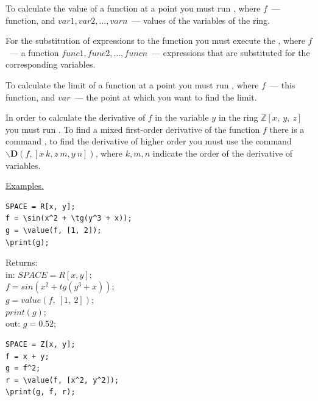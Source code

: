 To calculate the value of a function at a point you must run 
,
where $f$~---function, and 
$var1, var2, \ldots, varn $~--- values 
of the variables of the 
ring.

 For the substitution of expressions to the function you must execute the 
, where $ f $~--- a function
$ func1, func2, \ldots, funcn $~--- expressions that are substituted for the corresponding variables.

 To calculate the limit of a function at a point you must run 
,
where $ f $~--- this function, and $ var $~--- the point at which you want to find the limit.

 In order to calculate the derivative of 
$f$ in the variable 
$y$ in the ring $\mathbb {Z} [x, \ y, \ z]$
  you must run . To find a mixed first-order derivative of the function $ f $ there is a command
, to find the derivative of higher order you must use the command  $\backslash {\mathbf {D}} (f, [x \widehat{\ }{} k, z \widehat{\ }{} m, y \widehat{\ }{} n])$, 
where $ k, m, n $ indicate the order of the derivative of variables.




\smallskip

\underline{Examples. }

\vspace*{-2mm}
\begin{verbatim}
SPACE = R[x, y];
f = \sin(x^2 + \tg(y^3 + x));
g = \value(f, [1, 2]);
\print(g);
\end{verbatim}\vspace*{-2mm}

Returns:\\
in: $SPACE=R[x, y];$\\ 
\hspace*{4mm} $f=sin(x^2+tg(y^3+x)); $\\
\hspace*{4mm} $g=value(f,\ [1,\ 2]); $\\
\hspace*{4mm} $print(g);$\\
out: $g = 0. 52;$\\

\vspace*{-2mm}
\begin{verbatim}
SPACE = Z[x, y];
f = x + y;
g = f^2;
r = \value(f, [x^2, y^2]);
\print(g, f, r);
\end{verbatim}\vspace*{-2mm}

